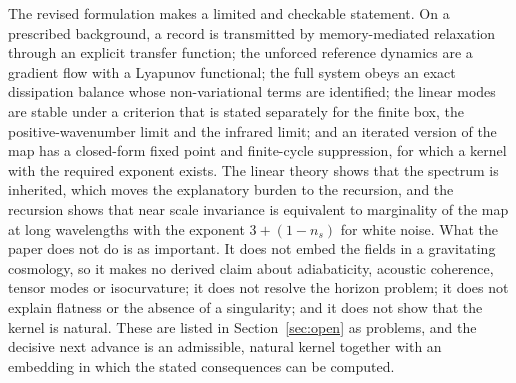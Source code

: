 \documentclass[11pt]{article}
\theoremstyle{definition}
\theoremstyle{remark}
\begin{document}
The revised formulation makes a limited and checkable statement. On a prescribed background, a record is transmitted by memory-mediated relaxation through an explicit transfer function; the unforced reference dynamics are a gradient flow with a Lyapunov functional; the full system obeys an exact dissipation balance whose non-variational terms are identified; the linear modes are stable under a criterion that is stated separately for the finite box, the positive-wavenumber limit and the infrared limit; and an iterated version of the map has a closed-form fixed point and finite-cycle suppression, for which a kernel with the required exponent exists. The linear theory shows that the spectrum is inherited, which moves the explanatory burden to the recursion, and the recursion shows that near scale invariance is equivalent to marginality of the map at long wavelengths with the exponent $3+(1-n_s)$ for white noise. What the paper does not do is as important. It does not embed the fields in a gravitating cosmology, so it makes no derived claim about adiabaticity, acoustic coherence, tensor modes or isocurvature; it does not resolve the horizon problem; it does not explain flatness or the absence of a singularity; and it does not show that the kernel is natural. These are listed in Section~\ref{sec:open} as problems, and the decisive next advance is an admissible, natural kernel together with an embedding in which the stated consequences can be computed.
\end{document}
